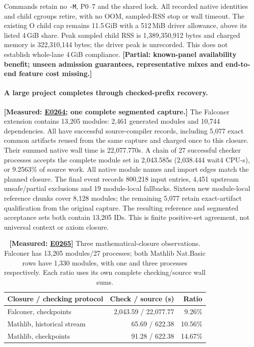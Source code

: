 \documentclass[10pt,twocolumn]{article}
\newcommand{\measured}[1]{\textbf{[Measured: #1]}}
\newcommand{\partialev}[1]{\textbf{[Partial: #1]}}
\newcommand{\expref}[2]{\href{https://github.com/yunwei37/proofserve/blob/main/docs/tmp/build-and-evaluate/step-#1/step-report.md}{E#2}}
\begin{document}
Commands retain no \texttt{-M}, P0--7 and the shared lock. All recorded native
identities and child cgroups retire, with no OOM, sampled-RSS stop or wall timeout.
The existing O child cap remains 11.5\,GiB with a 512\,MiB driver allowance,
above its listed 4\,GiB share. Peak sampled child RSS is 1,389,350,912 bytes
and charged memory is 322,310,144 bytes; the driver peak is unrecorded.
This does not establish whole-lane 4\,GiB compliance.
\partialev{known-panel availability benefit; unseen admission guarantees,
representative mixes and end-to-end feature cost missing.}


\paragraph{A large project completes through checked-prefix recovery.}
\measured{\expref{0264-20261102T061224+0000}{0264}; one complete segmented capture.}
The Falconer extension contains 13,205 modules: 2,461 generated modules and
10,744 dependencies. All have successful source-compiler records, including
5,077 exact common artifacts reused from the same capture and charged once
to this closure. Their summed native wall time is 22,077.770s.
A chain of 27 successful checker processes accepts the complete module set
in 2,043.585s (2,038.444 wait4 CPU-s), or 9.2563\% of source work.
All native module names and import edges match the planned closure.
The final event records 800,218 input entries, 4,451 upstream unsafe/partial
exclusions and 19 module-local fallbacks.
Sixteen new module-local reference chunks cover 8,128 modules; the remaining
5,077 retain exact-artifact qualification from the original capture.
The resulting reference and segmented acceptance sets both contain 13,205 IDs.
This is finite positive-set agreement, not universal context or axiom closure.

\begin{table}[t]
\centering\small
\setlength{\tabcolsep}{2pt}
\begin{tabular}{lrr}
\toprule
Closure / checking protocol & Check / source (s) & Ratio\\
\midrule
Falconer, checkpoints & 2,043.59 / 22,077.77 & 9.26\%\\
Mathlib, historical stream & 65.69 / 622.38 & 10.56\%\\
Mathlib, checkpoints & 91.28 / 622.38 & 14.67\%\\
\bottomrule
\end{tabular}
\caption{\measured{\expref{0265-20261102T065555+0000}{0265}} Three mathematical-closure
observations. Falconer has 13,205 modules/27 processes; both Mathlib Nat.Basic
rows have 1,330 modules, with one and three processes respectively.
Each ratio uses its own complete checking/source wall sums.}
\label{tab:mathclosureratios}
\end{table}
\end{document}
